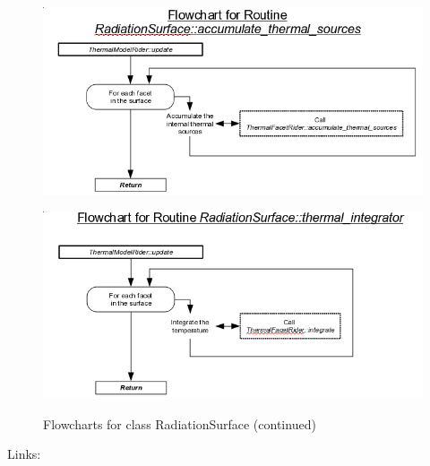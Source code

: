 \begin{figure}[!ht]
  \includegraphics[width = 6 in]{figs/flowchart/flow_accumulate_thermal_sources.png}
  \label{fig:flow_accumulate_thermal_sources}
  
  \includegraphics[width = 6 in]{figs/flowchart/flow_thermal_integrator.png}
  \label{fig:flow_thermal_integrator}
  \caption{Flowcharts for class RadiationSurface (continued) }
  
\end{figure}
Links: \newline
{}\newline
{}\newline
{}\newline
\clearpage



